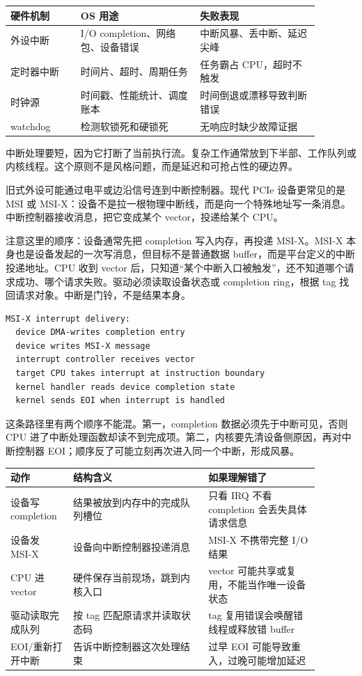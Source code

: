 \begin{longtable}{p{0.2\linewidth}p{0.34\linewidth}p{0.34\linewidth}}
\toprule
硬件机制 & OS 用途 & 失败表现 \\
\midrule
外设中断 & I/O completion、网络包、设备错误 & 中断风暴、丢中断、延迟尖峰 \\
定时器中断 & 时间片、超时、周期任务 & 任务霸占 CPU，超时不触发 \\
时钟源 & 时间戳、性能统计、调度账本 & 时间倒退或漂移导致判断错误 \\
watchdog & 检测软锁死和硬锁死 & 无响应时缺少故障证据 \\
\bottomrule
\end{longtable}

中断处理要短，因为它打断了当前执行流。复杂工作通常放到下半部、工作队列或内核线程。这个原则不是风格问题，而是延迟和可抢占性的硬边界。

旧式外设可能通过电平或边沿信号连到中断控制器。现代 PCIe 设备更常见的是 MSI 或 MSI-X：设备不是拉一根物理中断线，而是向一个特殊地址写一条消息。中断控制器接收消息，把它变成某个 vector，投递给某个 CPU。

注意这里的顺序：设备通常先把 completion 写入内存，再投递 MSI-X。MSI-X 本身也是设备发起的一次写消息，但目标不是普通数据 buffer，而是平台定义的中断投递地址。CPU 收到 vector 后，只知道“某个中断入口被触发”，还不知道哪个请求成功、哪个请求失败。驱动必须读取设备状态或 completion ring，根据 tag 找回请求对象。中断是门铃，不是结果本身。

\begin{lstlisting}
MSI-X interrupt delivery:
  device DMA-writes completion entry
  device writes MSI-X message
  interrupt controller receives vector
  target CPU takes interrupt at instruction boundary
  kernel handler reads device completion state
  kernel sends EOI when interrupt is handled
\end{lstlisting}

这条路径里有两个顺序不能混。第一，completion 数据必须先于中断可见，否则 CPU 进了中断处理函数却读不到完成项。第二，内核要先清设备侧原因，再对中断控制器 EOI；顺序反了可能立刻再次进入同一个中断，形成风暴。

\begin{longtable}{p{0.17\linewidth}p{0.39\linewidth}p{0.32\linewidth}}
\toprule
动作 & 结构含义 & 如果理解错了 \\
\midrule
设备写 completion & 结果被放到内存中的完成队列槽位 & 只看 IRQ 不看 completion 会丢失具体请求信息 \\
设备发 MSI-X & 设备向中断控制器投递消息 & MSI-X 不携带完整 I/O 结果 \\
CPU 进 vector & 硬件保存当前现场，跳到内核入口 & vector 可能共享或复用，不能当作唯一设备状态 \\
驱动读取完成队列 & 按 tag 匹配原请求并读取状态码 & tag 复用错误会唤醒错线程或释放错 buffer \\
EOI/重新打开中断 & 告诉中断控制器这次处理结束 & 过早 EOI 可能导致重入，过晚可能增加延迟 \\
\bottomrule
\end{longtable}

